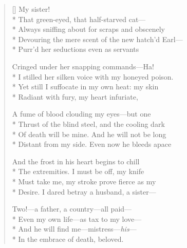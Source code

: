 \label{ch:lear_bm}
\settowidth{\versewidth}{Devouring the mere scent of the new hatch'd Earl---}
\begin{verse}[\versewidth]
 \qquad \qquad My sister!\\*
That green-eyed, that half-starved cat---\\*
Always sniffing about for scraps and obscenely\\*
Devouring the mere scent of the new hatch'd Earl---\\*
Purr'd her seductions even as servants

Cringed under her snapping commands---Ha!\\*
I stilled her silken voice with my honeyed poison.\\*
Yet still I suffocate in my own heat: my skin\\*
Radiant with fury, my heart infuriate,

A fume of blood clouding my eyes---but one\\*
Thrust of the blind steel, and the cooling dark\\*
Of death will be mine.  And he will not be long\\*
Distant from my side.  Even now he bleeds apace

And the frost in his heart begins to chill\\*
The extremities.  I must be off, my knife\\*
Must take me, my stroke prove fierce as my\\*
Desire.  I dared betray a husband, a sister---

Two!---a father, a country---all paid---\\*
Even my own life---as tax to my love---\\*
And he will find me---mistress---\textit{his}---\\*
In the embrace of death, beloved.
\end{verse}
